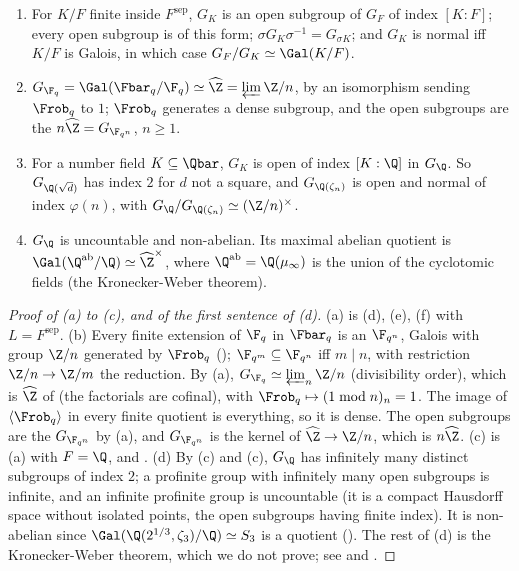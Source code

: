 \begin{proposition}\label{prop:galois:absolute}
\begin{enumerate}[label=(\alph*)]
\item For $K/F$ finite inside $F^{\mathrm{sep}}$, $G_K$ is an open subgroup of $G_F$ of index $[K:F]$; every open subgroup is of this form; $\sigma G_K\sigma^{-1}=
G_{\sigma K}$; and $G_K$ is normal iff $K/F$ is Galois, in which case $G_F/G_K\simeq\Gal(K/F)$.
\item $G_{\F_q}=\Gal(\Fbar_q/\F_q)\simeq\widehat\Z=\varprojlim\Z/n$, by an isomorphism sending $\Frob_q$ to $1$; $\Frob_q$ generates a dense subgroup, and the open
subgroups are the $n\widehat\Z=G_{\F_{q^n}}$, $n\ge1$.
\item For a number field $K\subseteq\Qbar$, $G_K$ is open of index $[K:\Q]$ in $G_\Q$. So $G_{\Q(\sqrt d)}$ has index $2$ for $d$ not a square, and $G_{\Q(\zeta_n)}$ is open
and normal of index $\varphi(n)$, with $G_\Q/G_{\Q(\zeta_n)}\simeq(\Z/n)^\times$.
\item $G_\Q$ is uncountable and non-abelian. Its maximal abelian quotient is $\Gal(\Q^{\mathrm{ab}}/\Q)\simeq\widehat\Z^\times$, where
$\Q^{\mathrm{ab}}=\Q(\mu_\infty)$ is the union of the cyclotomic fields (the Kronecker-Weber theorem).
\end{enumerate}
\end{proposition}

\begin{proof}[Proof of (a) to (c), and of the first sentence of (d)]
(a) is (d), (e), (f) with $L=F^{\mathrm{sep}}$. (b) Every finite extension of $\F_q$ in $\Fbar_q$ is an $\F_{q^n}$, Galois with group
$\Z/n$ generated by $\Frob_q$ (); $\F_{q^m}\subseteq\F_{q^n}$ iff $m\mid n$, with restriction $\Z/n\to\Z/m$ the reduction. By
(a), $G_{\F_q}\simeq\varprojlim_n\Z/n$ (divisibility order), which is $\widehat\Z$ of  (the factorials are cofinal), with
$\Frob_q\mapsto(1\bmod n)_n=1$. The image of $\langle\Frob_q\rangle$ in every finite quotient is everything, so it is dense. The open subgroups are the $G_{\F_{q^n}}$ by
(a), and $G_{\F_{q^n}}$ is the kernel of $\widehat\Z\to\Z/n$, which is $n\widehat\Z$. (c) is (a) with $F=\Q$, and . (d) By (c) and
(c), $G_\Q$ has infinitely many distinct subgroups of index $2$; a profinite group with infinitely many open subgroups is infinite, and an
infinite profinite group is uncountable (it is a compact Hausdorff space without isolated points, the open subgroups having finite index). It is non-abelian since
$\Gal(\Q(2^{1/3},\zeta_3)/\Q)\simeq S_3$ is a quotient (). The rest of (d) is the Kronecker-Weber theorem, which we do not prove; see
 and \cite[Chapter 14]{Washington}.
\end{proof}

